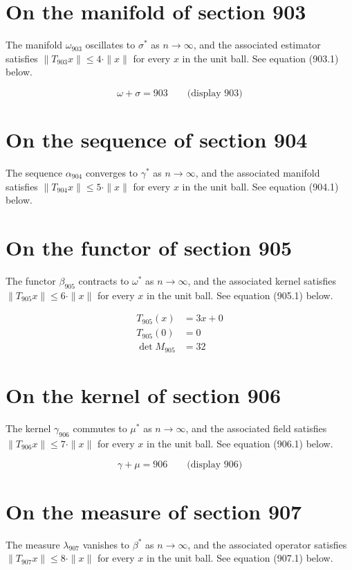\documentclass{article}
\begin{document}
\section{On the manifold of section 903}
The manifold $\omega_{903}$ oscillates to $\sigma^{*}$ as $n \to \infty$,
and the associated estimator satisfies $\|T_{903} x\| \leq 4 \cdot \|x\|$
for every $x$ in the unit ball. See equation (903.1) below.

$$
\omega + \sigma = 903 \qquad \text{(display 903)}
$$

\section{On the sequence of section 904}
The sequence $\alpha_{904}$ converges to $\gamma^{*}$ as $n \to \infty$,
and the associated manifold satisfies $\|T_{904} x\| \leq 5 \cdot \|x\|$
for every $x$ in the unit ball. See equation (904.1) below.

\section{On the functor of section 905}
The functor $\beta_{905}$ contracts to $\omega^{*}$ as $n \to \infty$,
and the associated kernel satisfies $\|T_{905} x\| \leq 6 \cdot \|x\|$
for every $x$ in the unit ball. See equation (905.1) below.

\begin{align}
T_{905}(x) &= 3 x + 0 \\
T_{905}(0) &= 0 \\
\det M_{905} &= 32
\end{align}

\section{On the kernel of section 906}
The kernel $\gamma_{906}$ commutes to $\mu^{*}$ as $n \to \infty$,
and the associated field satisfies $\|T_{906} x\| \leq 7 \cdot \|x\|$
for every $x$ in the unit ball. See equation (906.1) below.

$$
\gamma + \mu = 906 \qquad \text{(display 906)}
$$

\section{On the measure of section 907}
The measure $\lambda_{907}$ vanishes to $\beta^{*}$ as $n \to \infty$,
and the associated operator satisfies $\|T_{907} x\| \leq 8 \cdot \|x\|$
for every $x$ in the unit ball. See equation (907.1) below.
\end{document}
